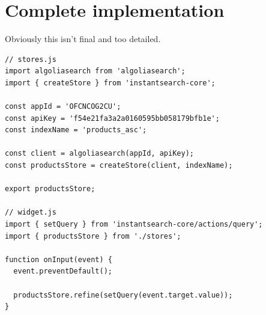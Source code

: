 
\section{Complete implementation} %
\label{sec:complete_implementation}

Obviously this isn't final and too detailed.

\begin{lstlisting}[caption={Using instantsearch-core},label={lst:is-core-usage}]
// stores.js
import algoliasearch from 'algoliasearch';
import { createStore } from 'instantsearch-core';

const appId = 'OFCNCOG2CU';
const apiKey = 'f54e21fa3a2a0160595bb058179bfb1e';
const indexName = 'products_asc';

const client = algoliasearch(appId, apiKey);
const productsStore = createStore(client, indexName);

export productsStore;

// widget.js
import { setQuery } from 'instantsearch-core/actions/query';
import { productsStore } from './stores';

function onInput(event) {
  event.preventDefault();

  productsStore.refine(setQuery(event.target.value));
}
\end{lstlisting}


